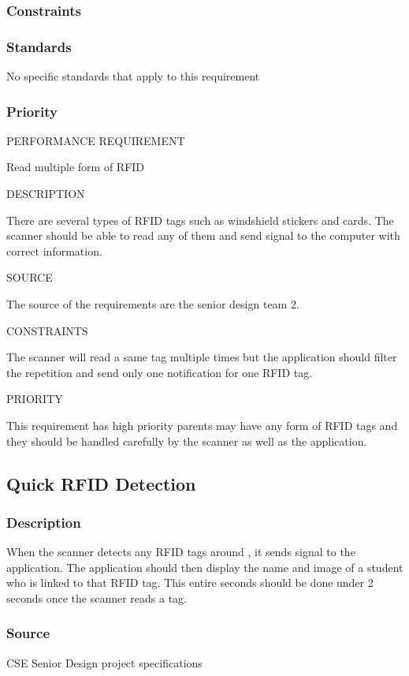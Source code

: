 \subsubsection{Constraints}

\subsubsection{Standards}
No specific standards that apply to this requirement
\subsubsection{Priority}


PERFORMANCE REQUIREMENT

Read multiple form of RFID

DESCRIPTION

There are several types of RFID tags such as windshield stickers and cards. The scanner should be able to read any of them and send signal to the computer with correct information.

SOURCE


The source of the requirements are the senior design team 2.

CONSTRAINTS

The scanner will read a same tag multiple times but the application should filter the repetition and send only one notification for one RFID tag.

PRIORITY

This requirement has high priority parents may have any form of RFID tags and they should be handled carefully by the scanner as well as the application.



\subsection{Quick RFID Detection}
\subsubsection{Description}
When the scanner detects any RFID tags around , it sends signal to the application. 
The application should then display the name and image of a student who is linked to 
that RFID tag. This entire seconds should be done under 2 seconds once the scanner 
reads a tag.
\subsubsection{Source}
CSE Senior Design project specifications
